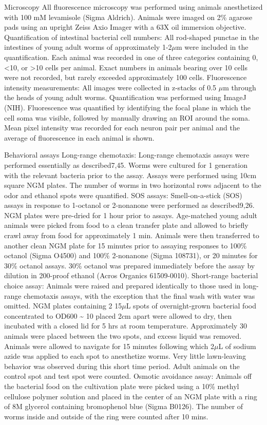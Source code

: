 \documentclass[]{article}
\begin{document}
Microscopy All fluorescence microscopy was performed using animals
anesthetized with 100 mM levamisole (Sigma Aldrich). Animals were imaged
on 2\% agarose pads using an upright Zeiss Axio Imager with a 63X oil
immersion objective. Quantification of intestinal bacterial cell
numbers: All rod-shaped punctae in the intestines of young adult worms
of approximately 1-2\(\mu\)m were included in the quantification. Each
animal was recorded in one of three categories containing 0,
\textless{}10, or \textgreater{}10 cells per animal. Exact numbers in
animals bearing over 10 cells were not recorded, but rarely exceeded
approximately 100 cells. Fluorescence intensity measurements: All images
were collected in z-stacks of 0.5 \(\mu\)m through the heads of young
adult worms. Quantification was performed using ImageJ (NIH).
Fluorescence was quantified by identifying the focal plane in which the
cell soma was visible, followed by manually drawing an ROI around the
soma. Mean pixel intensity was recorded for each neuron pair per animal
and the average of fluorescence in each animal is shown.

Behavioral assays Long-range chemotaxis: Long-range chemotaxis assays
were performed essentially as described7,45. Worms were cultured for 1
generation with the relevant bacteria prior to the assay. Assays were
performed using 10cm square NGM plates. The number of worms in two
horizontal rows adjacent to the odor and ethanol spots were quantified.
SOS assays: Smell-on-a-stick (SOS) assays in response to 1-octanol or
2-nonanone were performed as described9,26. NGM plates were pre-dried
for 1 hour prior to assays. Age-matched young adult animals were picked
from food to a clean transfer plate and allowed to briefly crawl away
from food for approximately 1 min. Animals were then transferred to
another clean NGM plate for 15 minutes prior to assaying responses to
100\% octanol (Sigma O4500) and 100\% 2-nonanone (Sigma 108731), or 20
minutes for 30\% octanol assays. 30\% octanol was prepared immediately
before the assay by dilution in 200-proof ethanol (Acros Organics
61509-0010). Short-range bacterial choice assay: Animals were raised and
prepared identically to those used in long-range chemotaxis assays, with
the exception that the final wash with water was omitted. NGM plates
containing 2 15\(\mu\)L spots of overnight-grown bacterial food
concentrated to OD600 \textasciitilde{} 10 placed 2cm apart were allowed
to dry, then incubated with a closed lid for 5 hrs at room temperature.
Approximately 30 animals were placed between the two spots, and excess
liquid was removed. Animals were allowed to navigate for 15 minutes
following which 2\(\mu\)L of sodium azide was applied to each spot to
anesthetize worms. Very little lawn-leaving behavior was observed during
this short time period. Adult animals on the control spot and test spot
were counted. Osmotic avoidance assay: Animals off the bacterial food on
the cultivation plate were picked using a 10\% methyl cellulose polymer
solution and placed in the center of an NGM plate with a ring of 8M
glycerol containing bromophenol blue (Sigma B0126). The number of worms
inside and outside of the ring were counted after 10 mins.
\end{document}
